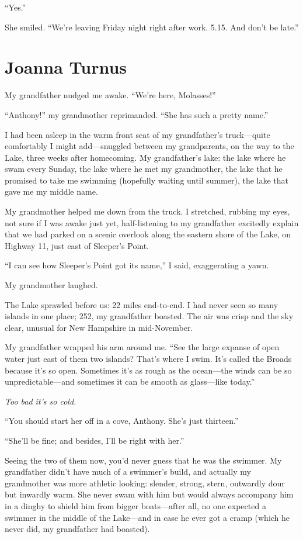 ``Yes.''

She smiled. ``We're leaving Friday night right after work. 5.15. And
don't be late.''

\chapter{Joanna Turnus}

\titlemark

My grandfather nudged me awake. ``We're here, Molasses!''

``Anthony!'' my grandmother reprimanded. ``She has such a pretty name.''

I had been asleep in the warm front seat of my grandfather's
truck---quite comfortably I might add---snuggled between my
grandparents, on the way to the Lake, three weeks after homecoming. My
grandfather's lake: the lake where he swam every Sunday, the lake where
he met my grandmother, the lake that he promised to take me swimming
(hopefully waiting until summer), the lake that gave me my middle name.

My grandmother helped me down from the truck. I stretched, rubbing my
eyes, not sure if I was awake just yet, half-listening to my grandfather
excitedly explain that we had parked on a scenic overlook along the
eastern shore of the Lake, on Highway 11, just east of Sleeper's Point.

``I can see how Sleeper's Point got its name,'' I said, exaggerating a
yawn.

My grandmother laughed.

The Lake sprawled before us: 22 miles end-to-end. I had never seen so
many islands in one place; 252, my grandfather boasted. The air was
crisp and the sky clear, unusual for New Hampshire in mid-November.

My grandfather wrapped his arm around me. ``See the large expanse of
open water just east of them two islands? That's where I swim. It's
called the Broads because it's so open. Sometimes it's as rough as the
ocean---the winds can be so unpredictable---and sometimes it can be
smooth as glass---like today.''

\emph{Too bad it's so cold.}

``You should start her off in a cove, Anthony. She's just thirteen.''

``She'll be fine; and besides, I'll be right with her.''

Seeing the two of them now, you'd never guess that he was the swimmer.
My grandfather didn't have much of a swimmer's build, and actually my
grandmother was more athletic looking: slender, strong, stern, outwardly
dour but inwardly warm. She never swam with him but would always
accompany him in a dinghy to shield him from bigger boats---after all,
no one expected a swimmer in the middle of the Lake---and in case he
ever got a cramp (which he never did, my grandfather had boasted).

